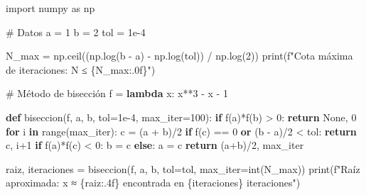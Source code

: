 \documentclass[
  english,
  letterpaper,
  DIV=11,
  numbers=noendperiod]{scrartcl}
\newenvironment{Shaded}{\begin{snugshade}}{\end{snugshade}}
\newcommand{\BuiltInTok}[1]{\textcolor[rgb]{0.00,0.23,0.31}{#1}}
\newcommand{\CommentTok}[1]{\textcolor[rgb]{0.37,0.37,0.37}{#1}}
\newcommand{\ControlFlowTok}[1]{\textcolor[rgb]{0.00,0.23,0.31}{\textbf{#1}}}
\newcommand{\DecValTok}[1]{\textcolor[rgb]{0.68,0.00,0.00}{#1}}
\newcommand{\FloatTok}[1]{\textcolor[rgb]{0.68,0.00,0.00}{#1}}
\newcommand{\ImportTok}[1]{\textcolor[rgb]{0.00,0.46,0.62}{#1}}
\newcommand{\KeywordTok}[1]{\textcolor[rgb]{0.00,0.23,0.31}{\textbf{#1}}}
\newcommand{\NormalTok}[1]{\textcolor[rgb]{0.00,0.23,0.31}{#1}}
\newcommand{\OperatorTok}[1]{\textcolor[rgb]{0.37,0.37,0.37}{#1}}
\newcommand{\SpecialCharTok}[1]{\textcolor[rgb]{0.37,0.37,0.37}{#1}}
\newcommand{\SpecialStringTok}[1]{\textcolor[rgb]{0.13,0.47,0.30}{#1}}
\newcommand{\VariableTok}[1]{\textcolor[rgb]{0.07,0.07,0.07}{#1}}
\begin{document}
\begin{Shaded}
\begin{Highlighting}[]
\ImportTok{import}\NormalTok{ numpy }\ImportTok{as}\NormalTok{ np}

\CommentTok{\# Datos}
\NormalTok{a }\OperatorTok{=} \DecValTok{1}
\NormalTok{b }\OperatorTok{=} \DecValTok{2}
\NormalTok{tol }\OperatorTok{=} \FloatTok{1e{-}4}

\NormalTok{N\_max }\OperatorTok{=}\NormalTok{ np.ceil((np.log(b }\OperatorTok{{-}}\NormalTok{ a) }\OperatorTok{{-}}\NormalTok{ np.log(tol)) }\OperatorTok{/}\NormalTok{ np.log(}\DecValTok{2}\NormalTok{))}
\BuiltInTok{print}\NormalTok{(}\SpecialStringTok{f"Cota máxima de iteraciones: N ≤ }\SpecialCharTok{\{}\NormalTok{N\_max}\SpecialCharTok{:.0f\}}\SpecialStringTok{"}\NormalTok{)}

\CommentTok{\# Método de bisección}
\NormalTok{f }\OperatorTok{=} \KeywordTok{lambda}\NormalTok{ x: x}\OperatorTok{**}\DecValTok{3} \OperatorTok{{-}}\NormalTok{ x }\OperatorTok{{-}} \DecValTok{1}

\KeywordTok{def}\NormalTok{ biseccion(f, a, b, tol}\OperatorTok{=}\FloatTok{1e{-}4}\NormalTok{, max\_iter}\OperatorTok{=}\DecValTok{100}\NormalTok{):}
    \ControlFlowTok{if}\NormalTok{ f(a)}\OperatorTok{*}\NormalTok{f(b) }\OperatorTok{\textgreater{}} \DecValTok{0}\NormalTok{:}
        \ControlFlowTok{return} \VariableTok{None}\NormalTok{, }\DecValTok{0}
    \ControlFlowTok{for}\NormalTok{ i }\KeywordTok{in} \BuiltInTok{range}\NormalTok{(max\_iter):}
\NormalTok{        c }\OperatorTok{=}\NormalTok{ (a }\OperatorTok{+}\NormalTok{ b)}\OperatorTok{/}\DecValTok{2}
        \ControlFlowTok{if}\NormalTok{ f(c) }\OperatorTok{==} \DecValTok{0} \KeywordTok{or}\NormalTok{ (b }\OperatorTok{{-}}\NormalTok{ a)}\OperatorTok{/}\DecValTok{2} \OperatorTok{\textless{}}\NormalTok{ tol:}
            \ControlFlowTok{return}\NormalTok{ c, i}\OperatorTok{+}\DecValTok{1}
        \ControlFlowTok{if}\NormalTok{ f(a)}\OperatorTok{*}\NormalTok{f(c) }\OperatorTok{\textless{}} \DecValTok{0}\NormalTok{:}
\NormalTok{            b }\OperatorTok{=}\NormalTok{ c}
        \ControlFlowTok{else}\NormalTok{:}
\NormalTok{            a }\OperatorTok{=}\NormalTok{ c}
    \ControlFlowTok{return}\NormalTok{ (a}\OperatorTok{+}\NormalTok{b)}\OperatorTok{/}\DecValTok{2}\NormalTok{, max\_iter}

\NormalTok{raiz, iteraciones }\OperatorTok{=}\NormalTok{ biseccion(f, a, b, tol}\OperatorTok{=}\NormalTok{tol, max\_iter}\OperatorTok{=}\BuiltInTok{int}\NormalTok{(N\_max))}
\BuiltInTok{print}\NormalTok{(}\SpecialStringTok{f"Raíz aproximada: x ≈ }\SpecialCharTok{\{}\NormalTok{raiz}\SpecialCharTok{:.4f\}}\SpecialStringTok{ encontrada en }\SpecialCharTok{\{}\NormalTok{iteraciones}\SpecialCharTok{\}}\SpecialStringTok{ iteraciones"}\NormalTok{)}
\end{Highlighting}
\end{Shaded}
\end{document}
